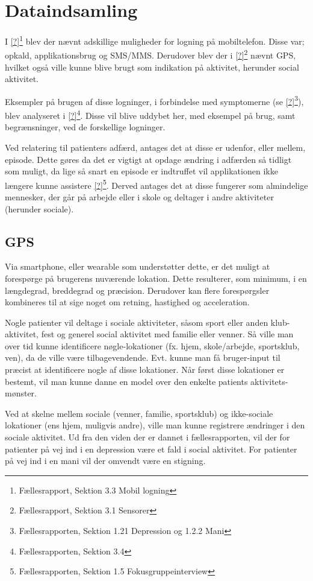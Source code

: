 \section{Dataindsamling}
I \cref{?}\footnote{Fællesrapport, Sektion 3.3 Mobil logning} blev der nævnt adskillige muligheder for logning på mobiltelefon.
Disse var; opkald, applikationsbrug og SMS/MMS.
Derudover blev der i \cref{?}\footnote{Fællesrapport, Sektion 3.1 Sensorer} nævnt GPS, hvilket også ville kunne blive brugt som indikation på aktivitet, herunder social aktivitet.

Eksempler på brugen af disse logninger, i forbindelse med symptomerne (se \cref{?}\footnote{Fællesrapporten, Sektion 1.21 Depression og 1.2.2 Mani}), blev analyseret i \cref{?}\footnote{Fællesrapporten, Sektion 3.4}.
Disse vil blive uddybet her, med eksempel på brug, samt begrænsninger, ved de forskellige logninger.

Ved relatering til patienters adfærd, antages det at disse er udenfor, eller mellem, episode.
Dette gøres da det er vigtigt at opdage ændring i adfærden så tidligt som muligt, da lige så snart en episode er indtruffet vil applikationen ikke længere kunne assistere \cref{?}\footnote{Fællesrapporten, Sektion 1.5 Fokusgruppeinterview}.
Derved antages det at disse fungerer som almindelige mennesker, der går på arbejde eller i skole og deltager i andre aktiviteter (herunder sociale).

\subsection{GPS}
Via smartphone, eller wearable som understøtter dette, er det muligt at forespørge på brugerens nuværende lokation.
Dette resulterer, som minimum, i en længdegrad, breddegrad og præcision.
Derudover kan flere forespørgsler kombineres til at sige noget om retning, hastighed og acceleration.

Nogle patienter vil deltage i sociale aktiviteter, såsom sport eller anden klub-aktivitet, fest og generel social aktivitet med familie eller venner.
Så ville man over tid kunne identificere nøgle-lokationer (fx. hjem, skole/arbejde, sportsklub, ven), da de ville være tilbagevendende.
Evt. kunne man få bruger-input til præcist at identificere nogle af disse lokationer.
Når først disse lokationer er bestemt, vil man kunne danne en model over den enkelte patients aktivitets-mønster.

Ved at skelne mellem sociale (venner, familie, sportsklub) og ikke-sociale lokationer (ens hjem, muligvis andre), ville man kunne registrere ændringer i den sociale aktivitet.
Ud fra den viden der er dannet i fællesrapporten, vil der for patienter på vej ind i en depression være et fald i social aktivitet.
For patienter på vej ind i en mani vil der omvendt være en stigning.

